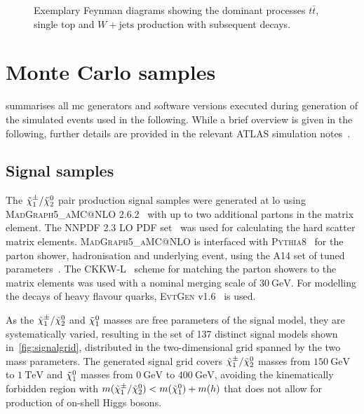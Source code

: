 \begin{figure}
\begin{subfigure}[b]{0.3\linewidth}
		\caption{\label{fig:wjets}}
	\end{subfigure}
	\caption{Exemplary Feynman diagrams showing the dominant processes  $t\bar{t}$,  single top and  $W+\textrm{jets}$ production with subsequent decays.}
	\label{fig:sm_backgrounds_feynman}
\end{figure}


\section{Monte Carlo samples}

 summarises all \gls{mc} generators and software versions executed during generation of the simulated events used in the following. While a brief overview is given in the following, further details are provided in the relevant ATLAS simulation notes~\cite{ATL-PHYS-PUB-2018-009,ATL-PHYS-PUB-2016-005,ATL-PHYS-PUB-2017-006,ATL-PHYS-PUB-2017-005}.

\subsection{Signal samples}\label{sec:signal_samples}

The $\tilde{\chi}_1^\pm/\tilde{\chi}_2^0$ pair production signal samples were generated at \gls{lo} using \textsc{MadGraph5\_aMC@NLO} 2.6.2~\cite{MGaMCNLO:2014hca,Frederix:2012ps} with up to two additional partons in the matrix element. The NNPDF 2.3 LO \gls{PDF} set~\cite{Ball:2012cx} was used for calculating the hard scatter matrix elements.
\textsc{MadGraph5\_aMC@NLO} is interfaced with \textsc{Pythia8}~\cite{Pythia8:2007gs} for the parton shower, hadronisation and underlying event, using the A14 set of tuned parameters~\cite{ATL-PHYS-PUB-2014-021}. The CKKW-L~\cite{Lonnblad:2011xx} scheme for matching the parton showers to the matrix elements was used with a nominal merging scale of $\SI{30}{\GeV}$.
For modelling the decays of heavy flavour quarks, \textsc{EvtGen} v1.6~\cite{Lange:2001uf} is used. 

As the $\tilde{\chi}_1^\pm/\tilde{\chi}_2^0$ and $\tilde{\chi}_1^0$ masses are free parameters of the signal model, they are systematically varied, resulting in the set of 137 distinct signal models shown in~\cref{fig:signalgrid}, distributed in the two-dimensional grid spanned by the two mass parameters.
The generated signal grid covers $\tilde{\chi}_1^\pm/\tilde{\chi}_2^0$ masses from $\SI{150}{\GeV}$ to $\SI{1}{\TeV}$ and $\tilde{\chi}_1^0$ masses from $\SI{0}{\GeV}$ to $\SI{400}{\GeV}$, avoiding the kinematically forbidden region with $m(\tilde{\chi}_1^\pm/\tilde{\chi}_2^0) < m(\tilde{\chi}_1^0) + m(h)$ that does not allow for production of on-shell Higgs bosons.

